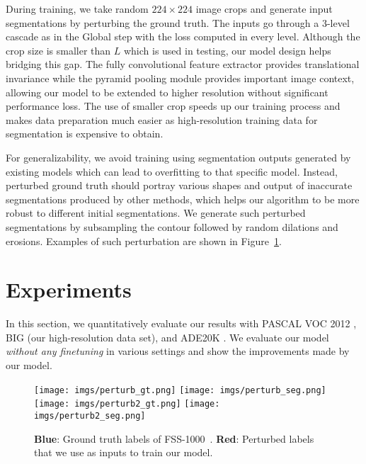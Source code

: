 \documentclass[10pt,twocolumn,letterpaper]{article}
\begin{document}
During training, we take random $224\times224$ image crops and generate input segmentations by perturbing the ground truth. The inputs go through a 3-level cascade as in the Global step with the loss computed in every level. 
Although the crop size is smaller than $L$ which is used in testing, our model design helps bridging this gap. The fully convolutional feature extractor provides translational invariance while the pyramid pooling module provides important image context, allowing our model to be extended to higher resolution without significant performance loss. The use of smaller crop speeds up our training process and makes data preparation much easier as high-resolution training data for segmentation is expensive to obtain.

For generalizability, we avoid training using segmentation outputs generated by existing models which can lead to overfitting to that specific model. 
Instead, perturbed ground truth should portray various shapes and output of inaccurate segmentations produced by other methods, which helps our algorithm to be more robust to different initial segmentations. We generate such perturbed segmentations by subsampling the contour followed by random dilations and erosions. Examples of such perturbation are shown in Figure~\ref{fig:perturb}.

\section{Experiments}
In this section, we quantitatively evaluate our results with PASCAL VOC 2012 \cite{Pascal}, BIG (our high-resolution data set), and ADE20K \cite{zhou2017scene}. We evaluate our model \textit{without any finetuning} in various settings and show the improvements made by our model. 


\begin{figure}[t]
	\texttt{[image: imgs/perturb\_gt.png]}
	\endminipage\hfill
	\texttt{[image: imgs/perturb\_seg.png]}
	\endminipage\hfill
	\texttt{[image: imgs/perturb2\_gt.png]}
	\endminipage\hfill
	\texttt{[image: imgs/perturb2\_seg.png]}
	\endminipage\hfill
	\caption{\textbf{Blue}: Ground truth labels of FSS-1000~\cite{FSS1000}.
	\textbf{Red}: Perturbed labels that we use as inputs to train our model.}
	\label{fig:perturb}
	\vspace{-0.15in}
\end{figure}
\end{document}
